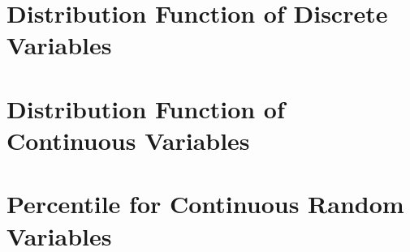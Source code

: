 \section{Distribution Function of Discrete Variables}

\section{Distribution Function of Continuous Variables}

\section{Percentile for Continuous Random Variables}

